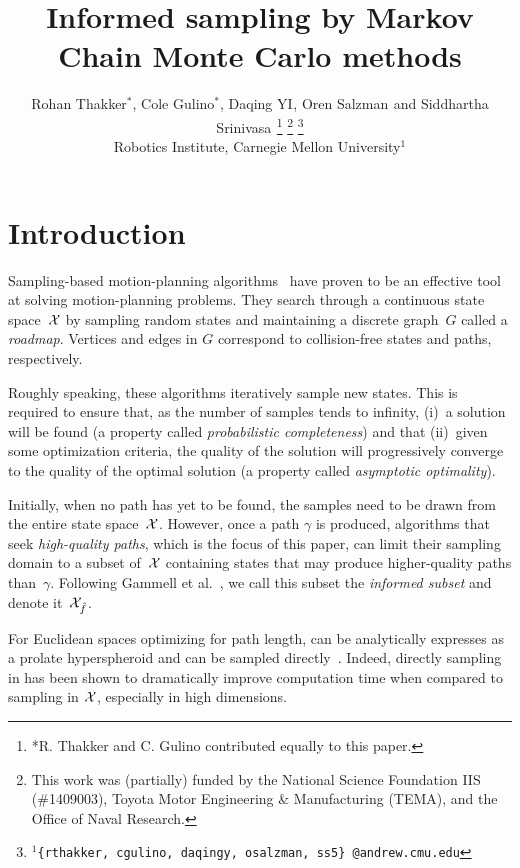 \documentclass[letterpaper, 10 pt, conference]{ieeeconf}  %
\title{\LARGE \bf
Informed sampling by Markov Chain Monte Carlo methods
}
\author{
Rohan Thakker$^{*}$,
Cole Gulino$^{*}$,
Daqing YI$^{}$,
Oren Salzman$^{}$ and
Siddhartha Srinivasa$^{}$%
\thanks{*R. Thakker and C. Gulino contributed equally to this paper.}
\thanks{This work was (partially) funded by the National Science Foundation IIS (\#1409003), Toyota Motor Engineering \& Manufacturing (TEMA), and the Office of Naval Research.}%
\thanks{$^{1}${\tt\small \{rthakker, cgulino, daqingy, osalzman, ss5\} @andrew.cmu.edu}}%
%
\\        
Robotics Institute, Carnegie Mellon University$^{1}$
}
\begin{document}
\maketitle
\thispagestyle{empty}
\pagestyle{empty}


\begin{abstract}

\end{abstract}


\section{Introduction}
\label{sec:intro}

Sampling-based motion-planning algorithms~\cite{CBHKKLT05, L06} have proven to be an effective tool at solving motion-planning problems.
They search through a continuous state space~$\mathcal{X}$ by sampling random states and maintaining a discrete graph~$G$ called a \emph{roadmap}.
Vertices and edges in $G$ correspond to collision-free states and paths, respectively.

Roughly speaking, these algorithms iteratively sample new states.
This is required to ensure that, as the number of samples tends to infinity, 
(i)~a solution will be found 
(a property called \emph{probabilistic completeness})
and that
(ii)~given some optimization criteria, the quality of the solution will progressively converge to the quality of the optimal solution
(a property called \emph{asymptotic  optimality}).

Initially, 
when no path has yet to be found, 
the samples need to be drawn from the entire state space~$\mathcal{X}$.
However, once a path $\gamma$ is produced,  algorithms that seek \emph{high-quality paths}, which is the focus of this paper, can limit their sampling domain to a subset of~$\mathcal{X}$  containing states that may produce higher-quality paths than~$\gamma$.
Following Gammell et al.~\cite{GSB14}, we call this subset the \emph{informed subset} and denote it~$\mathcal{X}_{\hat{f}}$.

For Euclidean spaces optimizing for path length, 
\Cinf can be analytically expresses as a prolate hyperspheroid and can be sampled directly~\cite{GSB14}.
Indeed, directly sampling in \Cinf has been shown to dramatically improve computation time when compared to sampling in $\mathcal{X}$, especially in high dimensions. 
\end{document}
